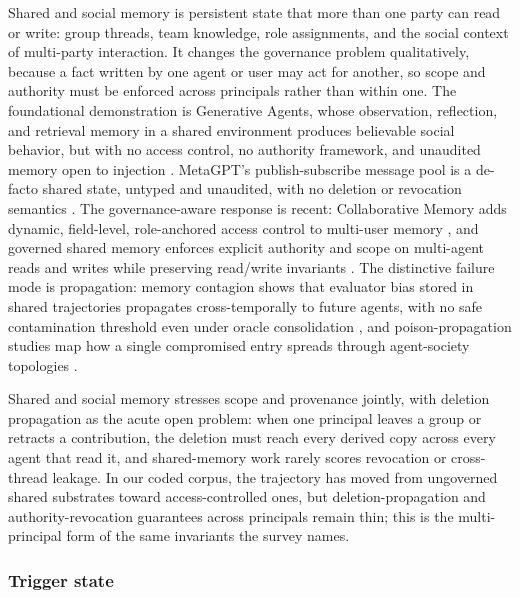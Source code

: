 Shared and social memory is persistent state that more than one party can read or write: group threads, team knowledge, role assignments, and the social context of multi-party interaction. It changes the governance problem qualitatively, because a fact written by one agent or user may act for another, so scope and authority must be enforced across principals rather than within one. The foundational demonstration is Generative Agents, whose observation, reflection, and retrieval memory in a shared environment produces believable social behavior, but with no access control, no authority framework, and unaudited memory open to injection \citep{park2023generativeagentsinteractivesimulacra}. MetaGPT's publish-subscribe message pool is a de-facto shared state, untyped and unaudited, with no deletion or revocation semantics \citep{hong2023metagpt}. The governance-aware response is recent: Collaborative Memory adds dynamic, field-level, role-anchored access control to multi-user memory \citep{rezazadeh2025collaborativememorymultiusermemory}, and governed shared memory enforces explicit authority and scope on multi-agent reads and writes while preserving read/write invariants \citep{margalit2026governedsharedmemorymultiagent}. The distinctive failure mode is propagation: memory contagion shows that evaluator bias stored in shared trajectories propagates cross-temporally to future agents, with no safe contamination threshold even under oracle consolidation \citep{liu2026memorycontagion}, and poison-propagation studies map how a single compromised entry spreads through agent-society topologies \citep{men2024troublemaker}.

Shared and social memory stresses scope and provenance jointly, with deletion propagation as the acute open problem: when one principal leaves a group or retracts a contribution, the deletion must reach every derived copy across every agent that read it, and shared-memory work rarely scores revocation or cross-thread leakage. In our coded corpus, the trajectory has moved from ungoverned shared substrates toward access-controlled ones, but deletion-propagation and authority-revocation guarantees across principals remain thin; this is the multi-principal form of the same invariants the survey names.

\subsubsection{Trigger state}

